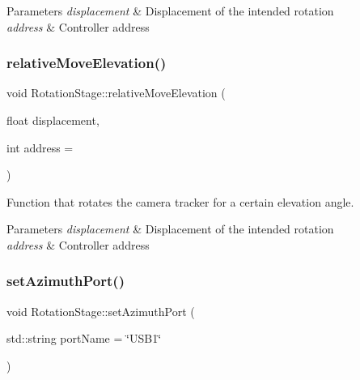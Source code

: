 \begin{DoxyParams}{Parameters}
{\em displacement} & Displacement of the intended rotation \\
\hline
{\em address} & Controller address \\
\hline
\end{DoxyParams}
\mbox{\label{class_rotation_stage_aeeb1a8db6fe729db66fd7d5712dc8dee}} 
\subsubsection{\texorpdfstring{relative\+Move\+Elevation()}{relativeMoveElevation()}}
{\footnotesize\ttfamily void Rotation\+Stage\+::relative\+Move\+Elevation (\begin{DoxyParamCaption}\item[{float}]{displacement,  }\item[{int}]{address = {} }\end{DoxyParamCaption})}



Function that rotates the camera tracker for a certain elevation angle. 


\begin{DoxyParams}{Parameters}
{\em displacement} & Displacement of the intended rotation \\
\hline
{\em address} & Controller address \\
\hline
\end{DoxyParams}
\mbox{\label{class_rotation_stage_a4fda0b9c1b8a4d6322aa48c5313a55a8}} 
\subsubsection{\texorpdfstring{set\+Azimuth\+Port()}{setAzimuthPort()}}
{\footnotesize\ttfamily void Rotation\+Stage\+::set\+Azimuth\+Port (\begin{DoxyParamCaption}\item[{std\+::string}]{port\+Name = {\ttfamily \char`\"{}USB1\char`\"{}} }\end{DoxyParamCaption})}



